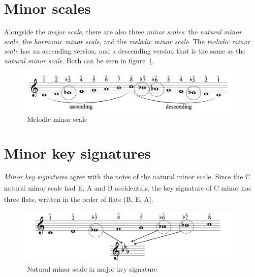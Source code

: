 \section{Minor scales}\label{sec:minor-scales}

Alongside the \textit{major scale}, there are also three \textit{minor scales}: the \textit{natural minor scale}, the \textit{harmonic minor scale}, and the \textit{melodic minor scale}.
The \textit{melodic minor scale} has an ascending version, and a descending version that is the same as the \textit{natural minor scale}.
Both can be seen in figure~\ref{fig:minor-scale}.


\begin{figure}
    \centering
    \includegraphics[width=\textwidth]{assets/minor-scale}
    \caption{~Melodic minor scale~\cite{music-theory}}\label{fig:minor-scale}
\end{figure}


\section{Minor key signatures}\label{sec:minor-key-signatures}

\textit{Minor key signatures} agree with the notes of the natural minor scale.
Since the C natural minor scale had E\textsuperscript{\fl}, A\textsuperscript{\fl} and B\textsuperscript{\fl} accidentals, the key signature of C minor has three flats, written in the order of flats (B\textsuperscript{\fl}, E\textsuperscript{\fl}, A\textsuperscript{\fl}).~\cite{music-theory}


\begin{figure}
    \centering
    \includegraphics[width=\textwidth]{assets/natural-in-major}
    \caption{~Natural minor scale in major key signature~\cite{music-theory}}\label{fig:natural-in-major}
\end{figure}



